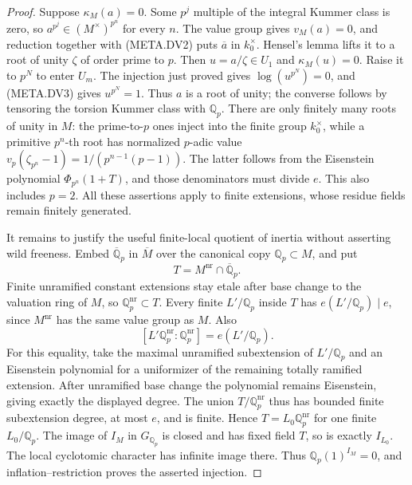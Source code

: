 \begin{proof}
Suppose $\kappa_M(a)=0$.
Some $p^j$ multiple of the integral Kummer class
is zero, so $a^{p^j}\in(M^\times)^{p^n}$ for every $n$.
The value group gives $v_M(a)=0$, and reduction
together with (META.DV2) puts $\overline a$ in
$k_0^\times$.
Hensel's lemma lifts it to a root of unity $\zeta$
of order prime to $p$.
Then $u=a/\zeta\in U_1$ and $\kappa_M(u)=0$.
Raise it to $p^N$ to enter $U_m$.
The injection just proved gives $\log(u^{p^N})=0$,
and (META.DV3) gives $u^{p^N}=1$.
Thus $a$ is a root of unity; the converse follows
by tensoring the torsion Kummer class with $\mathbb Q_p$.
There are only finitely many roots of unity in $M$:
the prime-to-$p$ ones inject into the finite group
$k_0^\times$, while a primitive $p^n$-th root has
normalized $p$-adic value
$v_p(\zeta_{p^n}-1)=1/(p^{n-1}(p-1))$.
The latter follows from the Eisenstein polynomial
$\Phi_{p^n}(1+T)$, and those denominators must divide
$e$.  This also includes $p=2$.
All these assertions apply to finite extensions,
whose residue fields remain finitely generated.

It remains to justify the useful finite-local
quotient of inertia without asserting wild freeness.
Embed $\overline{\mathbb Q}_p$ in $\overline M$
over the canonical copy $\mathbb Q_p\subset M$,
and put
\[
                  T=M^{\mathrm{nr}}\cap\overline{\mathbb Q}_p.
\]
Finite unramified constant extensions stay etale
after base change to the valuation ring of $M$,
so $\mathbb Q_p^{\mathrm{nr}}\subset T$.
Every finite $L'/\mathbb Q_p$ inside $T$ has
$e(L'/\mathbb Q_p)\mid e$, since $M^{\mathrm{nr}}$
has the same value group as $M$.
Also
\[
 [L'\mathbb Q_p^{\mathrm{nr}}:\mathbb Q_p^{\mathrm{nr}}]
                                      =e(L'/\mathbb Q_p).
\]
For this equality, take the maximal unramified
subextension of $L'/\mathbb Q_p$ and an Eisenstein
polynomial for a uniformizer of the remaining
totally ramified extension.
After unramified base change the polynomial remains
Eisenstein, giving exactly the displayed degree.
The union $T/\mathbb Q_p^{\mathrm{nr}}$ thus has
bounded finite subextension degree, at most $e$,
and is finite.  Hence $T=L_0\mathbb Q_p^{\mathrm{nr}}$
for one finite $L_0/\mathbb Q_p$.
The image of $I_M$ in $G_{\mathbb Q_p}$ is closed
and has fixed field $T$, so is exactly $I_{L_0}$.
The local cyclotomic character has infinite image
there.  Thus $\mathbb Q_p(1)^{I_M}=0$, and
inflation--restriction proves the asserted injection.


\end{proof}
